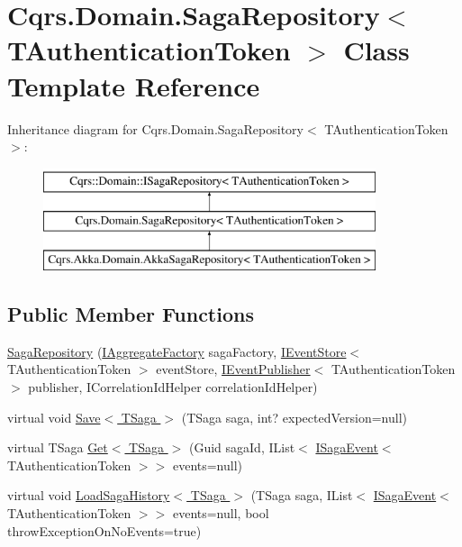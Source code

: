 \hypertarget{classCqrs_1_1Domain_1_1SagaRepository}{}\section{Cqrs.\+Domain.\+Saga\+Repository$<$ T\+Authentication\+Token $>$ Class Template Reference}
\label{classCqrs_1_1Domain_1_1SagaRepository}
Inheritance diagram for Cqrs.\+Domain.\+Saga\+Repository$<$ T\+Authentication\+Token $>$\+:\begin{figure}[H]
\begin{center}
\leavevmode
\includegraphics[height=3.000000cm]{classCqrs_1_1Domain_1_1SagaRepository}
\end{center}
\end{figure}
\subsection*{Public Member Functions}
\begin{DoxyCompactItemize}
\item 
\hyperlink{classCqrs_1_1Domain_1_1SagaRepository_a2981231b25fa89133ab50796cd352fbf}{Saga\+Repository} (\hyperlink{interfaceCqrs_1_1Domain_1_1Factories_1_1IAggregateFactory}{I\+Aggregate\+Factory} saga\+Factory, \hyperlink{interfaceCqrs_1_1Events_1_1IEventStore}{I\+Event\+Store}$<$ T\+Authentication\+Token $>$ event\+Store, \hyperlink{interfaceCqrs_1_1Events_1_1IEventPublisher}{I\+Event\+Publisher}$<$ T\+Authentication\+Token $>$ publisher, I\+Correlation\+Id\+Helper correlation\+Id\+Helper)
\item 
virtual void \hyperlink{classCqrs_1_1Domain_1_1SagaRepository_a84cae424cb01de22864ae7d960007cd0}{Save$<$ T\+Saga $>$} (T\+Saga saga, int? expected\+Version=null)
\item 
virtual T\+Saga \hyperlink{classCqrs_1_1Domain_1_1SagaRepository_a1b80ecc2a5719d1681ca5d182a252120}{Get$<$ T\+Saga $>$} (Guid saga\+Id, I\+List$<$ \hyperlink{interfaceCqrs_1_1Events_1_1ISagaEvent}{I\+Saga\+Event}$<$ T\+Authentication\+Token $>$$>$ events=null)
\item 
virtual void \hyperlink{classCqrs_1_1Domain_1_1SagaRepository_af6af9066681e47bc4ff2e14358321fb8}{Load\+Saga\+History$<$ T\+Saga $>$} (T\+Saga saga, I\+List$<$ \hyperlink{interfaceCqrs_1_1Events_1_1ISagaEvent}{I\+Saga\+Event}$<$ T\+Authentication\+Token $>$$>$ events=null, bool throw\+Exception\+On\+No\+Events=true)
\end{DoxyCompactItemize}
